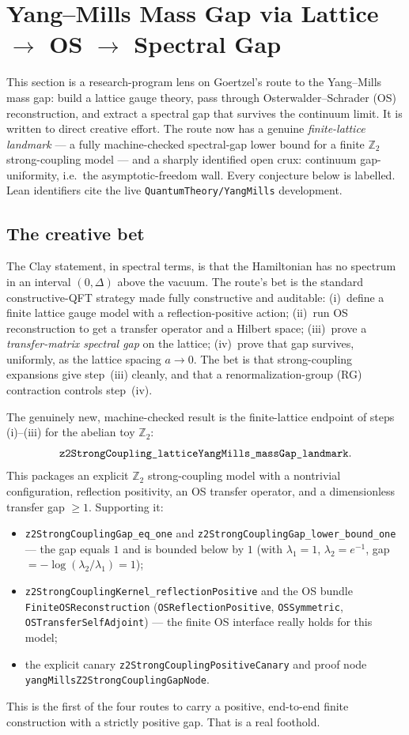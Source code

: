 \section{Yang--Mills Mass Gap via Lattice $\to$ OS $\to$ Spectral Gap}
\label{sec:goertzel-ym-state}

This section is a research-program lens on Goertzel's route to the Yang--Mills
mass gap: build a lattice gauge theory, pass through Osterwalder--Schrader (OS)
reconstruction, and extract a spectral gap that survives the continuum limit. It
is written to direct creative effort. The route now has a genuine
\emph{finite-lattice landmark} --- a fully machine-checked spectral-gap lower
bound for a finite $\mathbb{Z}_2$ strong-coupling model --- and a sharply
identified open crux: continuum gap-uniformity, i.e.\ the asymptotic-freedom
wall. Every conjecture below is labelled. Lean identifiers cite the live
\texttt{QuantumTheory/YangMills} development.

\subsection{The creative bet}

The Clay statement, in spectral terms, is that the Hamiltonian has no spectrum in
an interval $(0,\Delta)$ above the vacuum. The route's bet is the standard
constructive-QFT strategy made fully constructive and auditable: (i)~define a
finite lattice gauge model with a reflection-positive action; (ii)~run OS
reconstruction to get a transfer operator and a Hilbert space; (iii)~prove a
\emph{transfer-matrix spectral gap} on the lattice; (iv)~prove that gap survives,
uniformly, as the lattice spacing $a\to 0$. The bet is that strong-coupling
expansions give step~(iii) cleanly, and that a renormalization-group (RG)
contraction controls step~(iv).

The genuinely new, machine-checked result is the finite-lattice endpoint of
steps (i)--(iii) for the abelian toy $\mathbb{Z}_2$:
\[
  \verb|z2StrongCoupling_latticeYangMills_massGap_landmark|.
\]
This packages an explicit $\mathbb{Z}_2$ strong-coupling model with a nontrivial
configuration, reflection positivity, an OS transfer operator, and a
dimensionless transfer gap $\ge 1$. Supporting it:
\begin{itemize}\itemsep1pt
  \item \verb|z2StrongCouplingGap_eq_one| and
    \verb|z2StrongCouplingGap_lower_bound_one| --- the gap equals $1$ and is
    bounded below by $1$ (with $\lambda_1=1$, $\lambda_2=e^{-1}$, gap
    $=-\log(\lambda_2/\lambda_1)=1$);
  \item \verb|z2StrongCouplingKernel_reflectionPositive| and the OS bundle
    \verb|FiniteOSReconstruction| (\verb|OSReflectionPositive|,
    \verb|OSSymmetric|, \verb|OSTransferSelfAdjoint|) --- the finite OS
    interface really holds for this model;
  \item the explicit canary \verb|z2StrongCouplingPositiveCanary| and proof node
    \verb|yangMillsZ2StrongCouplingGapNode|.
\end{itemize}
This is the first of the four routes to carry a positive, end-to-end finite
construction with a strictly positive gap. That is a real foothold.

